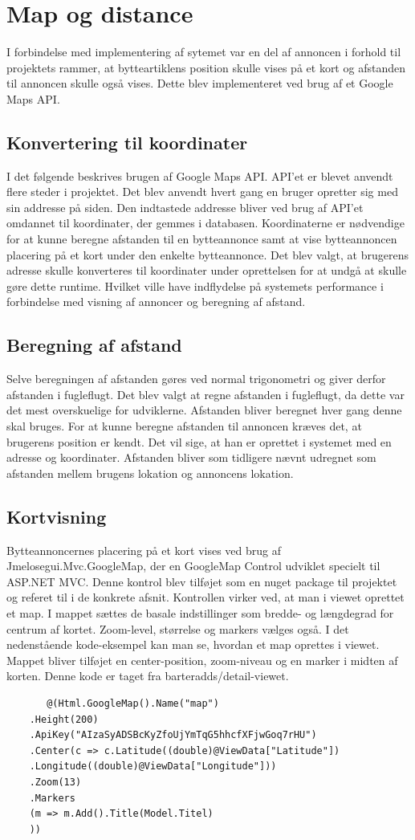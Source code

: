 \section{Map og distance}
I forbindelse med implementering af sytemet var en del af annoncen i forhold til projektets rammer, at bytteartiklens position skulle vises på et kort og afstanden til annoncen skulle også vises. Dette blev implementeret ved brug af et Google Maps API.
\subsection{Konvertering til koordinater}
I det følgende beskrives brugen af Google Maps API. API'et er blevet anvendt flere steder i projektet. Det blev anvendt hvert gang en bruger opretter sig med sin addresse på siden. Den indtastede addresse bliver ved brug af API'et omdannet til koordinater, der gemmes i databasen. Koordinaterne er nødvendige for at kunne beregne afstanden til en bytteannonce samt at vise bytteannoncen placering på et kort under den enkelte bytteannonce.
Det blev valgt, at brugerens adresse skulle konverteres til koordinater under oprettelsen for at undgå at skulle gøre dette runtime. Hvilket ville have indflydelse på systemets performance i forbindelse med visning af annoncer og beregning af afstand.

\subsection{Beregning af afstand}
Selve beregningen af afstanden gøres ved normal trigonometri og giver derfor afstanden i fugleflugt. Det blev valgt at regne afstanden i fugleflugt, da dette var det mest overskuelige for udviklerne. Afstanden bliver beregnet hver gang denne skal bruges. For at kunne beregne afstanden til annoncen kræves det, at brugerens position er kendt. Det vil sige, at han er oprettet i systemet med en adresse og koordinater. Afstanden bliver som tidligere nævnt udregnet som afstanden mellem brugens lokation og annoncens lokation.

\subsection{Kortvisning}
Bytteannoncernes placering på et kort vises ved brug af Jmelosegui.Mvc.GoogleMap, der en GoogleMap Control udviklet specielt til ASP.NET MVC. Denne kontrol blev tilføjet som en nuget package til projektet og referet til i de konkrete afsnit. Kontrollen virker ved, at man i viewet oprettet et map. I mappet sættes de basale indstillinger som bredde- og længdegrad for centrum af kortet. Zoom-level, størrelse og markers vælges også.
I det nedenstående kode-eksempel kan man se, hvordan et map oprettes i viewet. Mappet bliver tilføjet en center-position, zoom-niveau og en marker i midten af korten. Denne kode er taget fra barteradds/detail-viewet.
\begin{verbatim}
	   @(Html.GoogleMap().Name("map")
	.Height(200)
	.ApiKey("AIzaSyADSBcKyZfoUjYmTqG5hhcfXFjwGoq7rHU")
	.Center(c => c.Latitude((double)@ViewData["Latitude"])
	.Longitude((double)@ViewData["Longitude"]))
	.Zoom(13)
	.Markers
	(m => m.Add().Title(Model.Titel)
	))
\end{verbatim}

